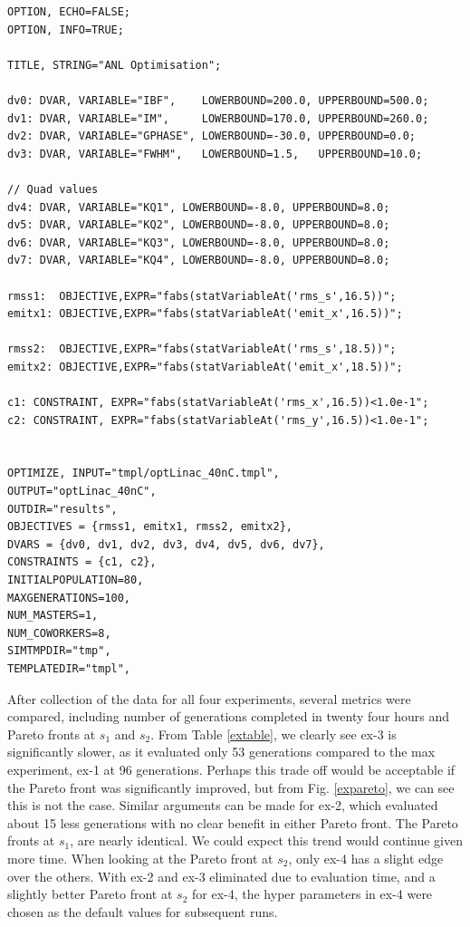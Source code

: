 \begin{Verbatim}[fontsize=\scriptsize]
OPTION, ECHO=FALSE;
OPTION, INFO=TRUE;

TITLE, STRING="ANL Optimisation";

dv0: DVAR, VARIABLE="IBF",    LOWERBOUND=200.0, UPPERBOUND=500.0;
dv1: DVAR, VARIABLE="IM",     LOWERBOUND=170.0, UPPERBOUND=260.0;
dv2: DVAR, VARIABLE="GPHASE", LOWERBOUND=-30.0, UPPERBOUND=0.0;
dv3: DVAR, VARIABLE="FWHM",   LOWERBOUND=1.5,   UPPERBOUND=10.0;

// Quad values
dv4: DVAR, VARIABLE="KQ1", LOWERBOUND=-8.0, UPPERBOUND=8.0;
dv5: DVAR, VARIABLE="KQ2", LOWERBOUND=-8.0, UPPERBOUND=8.0;
dv6: DVAR, VARIABLE="KQ3", LOWERBOUND=-8.0, UPPERBOUND=8.0;
dv7: DVAR, VARIABLE="KQ4", LOWERBOUND=-8.0, UPPERBOUND=8.0;

rmss1:  OBJECTIVE,EXPR="fabs(statVariableAt('rms_s',16.5))";
emitx1: OBJECTIVE,EXPR="fabs(statVariableAt('emit_x',16.5))";

rmss2:  OBJECTIVE,EXPR="fabs(statVariableAt('rms_s',18.5))";
emitx2: OBJECTIVE,EXPR="fabs(statVariableAt('emit_x',18.5))";

c1: CONSTRAINT, EXPR="fabs(statVariableAt('rms_x',16.5))<1.0e-1";
c2: CONSTRAINT, EXPR="fabs(statVariableAt('rms_y',16.5))<1.0e-1";


OPTIMIZE, INPUT="tmpl/optLinac_40nC.tmpl",
OUTPUT="optLinac_40nC",
OUTDIR="results",
OBJECTIVES = {rmss1, emitx1, rmss2, emitx2},
DVARS = {dv0, dv1, dv2, dv3, dv4, dv5, dv6, dv7},
CONSTRAINTS = {c1, c2},
INITIALPOPULATION=80,
MAXGENERATIONS=100,
NUM_MASTERS=1,
NUM_COWORKERS=8,
SIMTMPDIR="tmp",
TEMPLATEDIR="tmpl",
\end{Verbatim}

After collection of the data for all four experiments, several metrics
were compared, including number of generations completed in twenty four hours and
Pareto fronts at $s_1$ and $s_2$.
From Table \ref{extable}, we clearly see ex-3 is significantly 
slower, as it evaluated only 53 generations compared to the max 
experiment, ex-1 at 96 generations.
Perhaps this trade off would be acceptable if the Pareto front was significantly 
improved, but from Fig. \ref{expareto}, we can see this is not the case.
Similar arguments can be made for ex-2, which evaluated about 15 less generations
with no clear benefit in either Pareto front.
The Pareto fronts at $s_1$, are nearly identical. We could expect
this trend would continue given more time. 
When looking at the Pareto front at $s_2$, only ex-4 has a slight 
edge over the others.
With ex-2 and ex-3 eliminated due to evaluation time, 
and a slightly better Pareto front at $s_2$ for ex-4, the hyper parameters in ex-4 were chosen as the default values for subsequent runs.


